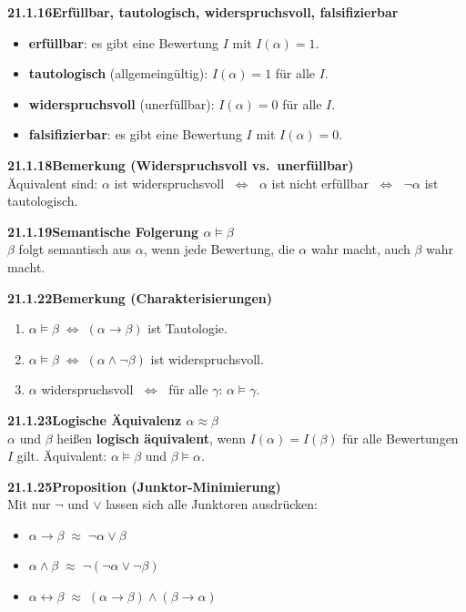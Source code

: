\documentclass[a4paper,12pt]{article}
\newcommand{\gentry}[3]{%
  \noindent\textbf{#1\quad #2}\nopagebreak\\[0.2em]
  #3\par\smallskip
}
\begin{document}
\gentry{21.1.16}{Erfüllbar, tautologisch, widerspruchsvoll, falsifizierbar}{%
  \begin{itemize}[topsep=2pt,itemsep=1pt]
    \item \textbf{erfüllbar}: es gibt eine Bewertung $I$ mit $I(\alpha)=1$.
    \item \textbf{tautologisch} (allgemeingültig): $I(\alpha)=1$ für alle $I$.
    \item \textbf{widerspruchsvoll} (unerfüllbar): $I(\alpha)=0$ für alle $I$.
    \item \textbf{falsifizierbar}: es gibt eine Bewertung $I$ mit $I(\alpha)=0$.
  \end{itemize}
}

\gentry{21.1.18}{Bemerkung (Widerspruchsvoll vs.\ unerfüllbar)}{%
  Äquivalent sind: $\alpha$ ist widerspruchsvoll $\;\Leftrightarrow\;$ $\alpha$
  ist nicht erfüllbar $\;\Leftrightarrow\;$ $\lnot\alpha$ ist tautologisch.
}

\gentry{21.1.19}{Semantische Folgerung $\alpha \models \beta$}{%
  $\beta$ folgt semantisch aus $\alpha$, wenn jede Bewertung, die $\alpha$ wahr
  macht, auch $\beta$ wahr macht.
}

\gentry{21.1.22}{Bemerkung (Charakterisierungen)}{%
  \begin{enumerate}[label=\arabic*.,topsep=2pt,itemsep=1pt]
    \item $\alpha \models \beta \;\Leftrightarrow\; (\alpha \to \beta)$ ist Tautologie.
    \item $\alpha \models \beta \;\Leftrightarrow\; (\alpha \land \lnot\beta)$ ist widerspruchsvoll.
    \item $\alpha$ widerspruchsvoll $\;\Leftrightarrow\;$ für alle $\gamma$: $\alpha \models \gamma$.
  \end{enumerate}
}

\gentry{21.1.23}{Logische Äquivalenz $\alpha \approx \beta$}{%
  $\alpha$ und $\beta$ heißen \textbf{logisch äquivalent}, wenn
  $I(\alpha) = I(\beta)$ für alle Bewertungen $I$ gilt.
  Äquivalent: $\alpha \models \beta$ und $\beta \models \alpha$.
}

\gentry{21.1.25}{Proposition (Junktor-Minimierung)}{%
  Mit nur $\lnot$ und $\lor$ lassen sich alle Junktoren ausdrücken:
  \begin{itemize}[topsep=2pt,itemsep=1pt]
    \item $\alpha \to \beta \;\approx\; \lnot\alpha \lor \beta$
    \item $\alpha \land \beta \;\approx\; \lnot(\lnot\alpha \lor \lnot\beta)$
    \item $\alpha \leftrightarrow \beta \;\approx\; (\alpha \to \beta) \land (\beta \to \alpha)$
  \end{itemize}
}
\end{document}
